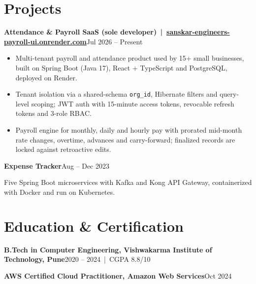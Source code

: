 \documentclass[10pt,a4paper]{article}
\newcommand{\role}[2]{\noindent\textbf{#1}\hfill #2\par}
\begin{document}
\section{Projects}
\role{Attendance \& Payroll SaaS (sole developer) \,|\, \normalfont\href{https://sanskar-engineers-payroll-ui.onrender.com}{sanskar-engineers-payroll-ui.onrender.com}}{Jul 2026 -- Present}
\begin{itemize}
  \item Multi-tenant payroll and attendance product used by 15+ small businesses, built on Spring Boot (Java 17), React + TypeScript and PostgreSQL, deployed on Render.
  \item Tenant isolation via a shared-schema \texttt{org\_id}, Hibernate filters and query-level scoping; JWT auth with 15-minute access tokens, revocable refresh tokens and 3-role RBAC.
  \item Payroll engine for monthly, daily and hourly pay with prorated mid-month rate changes, overtime, advances and carry-forward; finalized records are locked against retroactive edits.
\end{itemize}
\vspace{1pt}
\role{Expense Tracker}{Aug -- Dec 2023}
Five Spring Boot microservices with Kafka and Kong API Gateway, containerized with Docker and run on Kubernetes.

\section{Education \& Certification}
\role{B.Tech in Computer Engineering, Vishwakarma Institute of Technology, Pune}{2020 -- 2024 \,|\, CGPA 8.8/10}
\role{AWS Certified Cloud Practitioner, Amazon Web Services}{Oct 2024}
\end{document}

